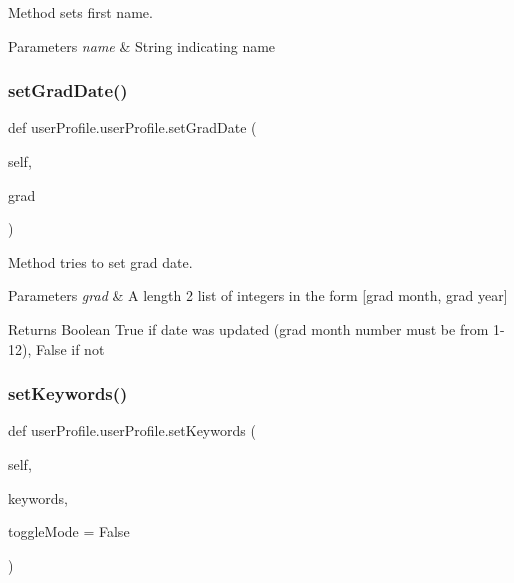 Method sets first name. 


\begin{DoxyParams}{Parameters}
{\em name} & String indicating name \\
\hline
\end{DoxyParams}
\mbox{\label{classuserProfile_1_1userProfile_a49e06c1b0a539a79d66108e096fc46d6}} 
\subsubsection{\texorpdfstring{set\+Grad\+Date()}{setGradDate()}}
{\footnotesize\ttfamily def user\+Profile.\+user\+Profile.\+set\+Grad\+Date (\begin{DoxyParamCaption}\item[{}]{self,  }\item[{}]{grad }\end{DoxyParamCaption})}



Method tries to set grad date. 


\begin{DoxyParams}{Parameters}
{\em grad} & A length 2 list of integers in the form \mbox{[}grad month, grad year\mbox{]} \\
\hline
\end{DoxyParams}
\begin{DoxyReturn}{Returns}
Boolean True if date was updated (grad month number must be from 1-\/12), False if not 
\end{DoxyReturn}
\mbox{\label{classuserProfile_1_1userProfile_ad1e2dc6aedf50cba360f2bc6669ea3f9}} 
\subsubsection{\texorpdfstring{set\+Keywords()}{setKeywords()}}
{\footnotesize\ttfamily def user\+Profile.\+user\+Profile.\+set\+Keywords (\begin{DoxyParamCaption}\item[{}]{self,  }\item[{}]{keywords,  }\item[{}]{toggle\+Mode = {\ttfamily False} }\end{DoxyParamCaption})}



